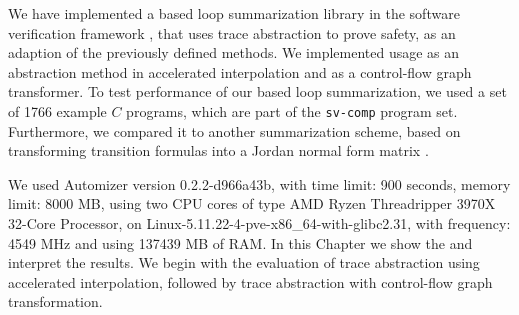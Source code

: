 
We have implemented a \qvasr based loop summarization library in the software verification framework \ultimate, that uses trace abstraction to prove safety, as an adaption of the previously defined methods. We implemented \qvasr usage as an abstraction method in  accelerated interpolation and as a control-flow graph transformer. To test performance of our \qvasr based loop summarization, we used a set of 1766 example $C$ programs, which are part of the \texttt{sv-comp} \cite{svcomp} program set. Furthermore, we compared it to another summarization scheme, based on transforming transition formulas into a Jordan normal form matrix \cite{DBLP:conf/popl/JeannetSS14}. \par
We used \ultimate Automizer version 0.2.2-d966a43b, with time limit: 900 seconds, memory limit: 8000 MB, using two CPU cores of type AMD Ryzen Threadripper 3970X 32-Core Processor, on Linux-5.11.22-4-pve-x86\_64-with-glibc2.31, with frequency: 4549 MHz and using 137439 MB of RAM. In this Chapter we show the and interpret the results. We begin with the evaluation of trace abstraction using accelerated interpolation, followed by trace abstraction with control-flow graph transformation.


